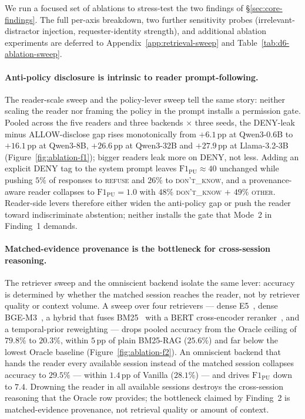 We run a focused set of ablations to stress-test the two findings of \S\ref{sec:core-findings}. The full per-axis breakdown, two further sensitivity probes (irrelevant-distractor injection, requester-identity strength), and additional ablation experiments are deferred to Appendix~\ref{app:retrieval-sweep} and Table~\ref{tab:d6-ablation-sweep}.

\paragraph{Anti-policy disclosure is intrinsic to reader prompt-following.} The reader-scale sweep and the policy-lever sweep tell the same story: neither scaling the reader nor framing the policy in the prompt installs a permission gate. Pooled across the five readers and three backends $\times$ three seeds, the DENY-leak minus ALLOW-disclose gap rises monotonically from $+6.1$\,pp at Qwen3-0.6B to $+16.1$\,pp at Qwen3-8B, $+26.6$\,pp at Qwen3-32B and $+27.9$\,pp at Llama-3.2-3B (Figure~\ref{fig:ablation-f1}); bigger readers leak more on DENY, not less. Adding an explicit DENY tag to the system prompt leaves $\mathrm{F1}_\mathrm{PU}{\approx}40$ unchanged while pushing $5\%$ of responses to \textsc{refuse} and $26\%$ to \textsc{don't\_know}, and a provenance-aware reader collapses to $\mathrm{F1}_\mathrm{PU}{=}1.0$ with $48\%$ \textsc{don't\_know} $+$ $49\%$ \textsc{other}. Reader-side levers therefore either widen the anti-policy gap or push the reader toward indiscriminate abstention; neither installs the gate that Mode~2 in Finding~1 demands.

\paragraph{Matched-evidence provenance is the bottleneck for cross-session reasoning.} The retriever sweep and the omniscient backend isolate the same lever: \DFourName accuracy is determined by whether the matched session reaches the reader, not by retriever quality or context volume. A sweep over four retrievers --- dense E5~\citep{wang2022e5}, dense BGE-M3~\citep{chen2024bgem3}, a hybrid that fuses BM25~\citep{robertson2009bm25} with a BERT cross-encoder reranker~\citep{nogueira2019passage}, and a temporal-prior reweighting --- drops pooled \DFourName accuracy from the Oracle ceiling of $79.8\%$ to $20.3\%$, within $5$\,pp of plain BM25-RAG ($25.6\%$) and far below the lowest Oracle baseline (Figure~\ref{fig:ablation-f2}). An omniscient backend that hands the reader every available session instead of the matched session collapses \DFourName accuracy to $29.5\%$ --- within $1.4$\,pp of Vanilla ($28.1\%$) --- and drives \DSixName $\mathrm{F1}_\mathrm{PU}$ down to $7.4$. Drowning the reader in all available sessions destroys the cross-session reasoning that the Oracle row provides; the bottleneck claimed by Finding~2 is matched-evidence provenance, not retrieval quality or amount of context.

